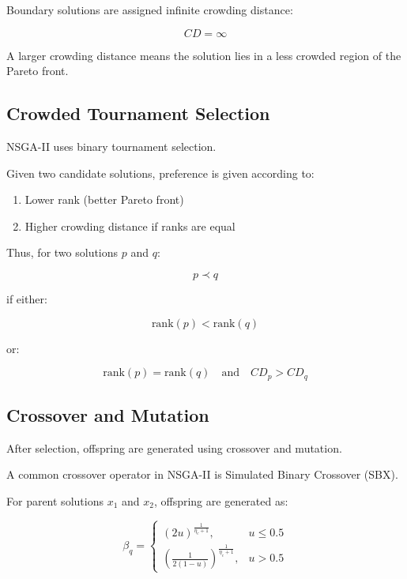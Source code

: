 \documentclass[11pt]{article}
\begin{document}
Boundary solutions are assigned infinite crowding distance:

\begin{equation}
CD = \infty
\end{equation}

A larger crowding distance means the solution lies in a less crowded region of the Pareto front.

\subsection{Crowded Tournament Selection}

NSGA-II uses binary tournament selection.

Given two candidate solutions, preference is given according to:

\begin{enumerate}
    \item Lower rank (better Pareto front)
    \item Higher crowding distance if ranks are equal
\end{enumerate}

Thus, for two solutions $p$ and $q$:

\begin{equation}
p \prec q
\end{equation}

if either:

\begin{equation}
\text{rank}(p) < \text{rank}(q)
\end{equation}

or:

\begin{equation}
\text{rank}(p) = \text{rank}(q) \quad \text{and} \quad CD_p > CD_q
\end{equation}

\subsection{Crossover and Mutation}

After selection, offspring are generated using crossover and mutation.

A common crossover operator in NSGA-II is Simulated Binary Crossover (SBX).

For parent solutions $x_1$ and $x_2$, offspring are generated as:

\begin{equation}
\beta_q =
\begin{cases}
(2u)^{\frac{1}{\eta_c+1}}, & u \leq 0.5 \\
\left(\frac{1}{2(1-u)}\right)^{\frac{1}{\eta_c+1}}, & u > 0.5
\end{cases}
\end{equation}
\end{document}
